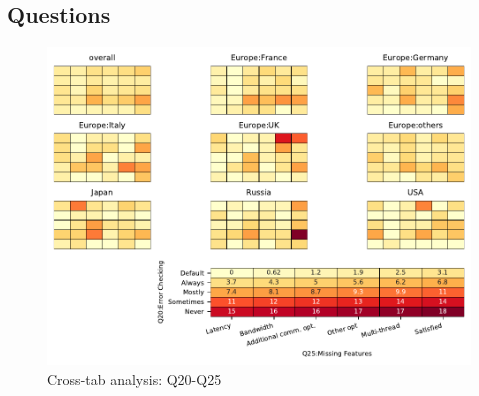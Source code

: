 
\subsection{Questions}


\begin{figure}
\begin{center}
\includegraphics[width=12cm]{../pdfs/Q20-Q25.pdf}
\caption{Cross-tab analysis: Q20-Q25}
\label{fig:Q20-Q25}
\end{center}
\end{figure}
